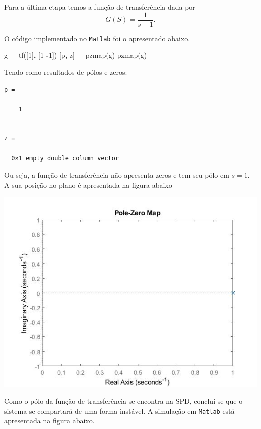 \documentclass[
]{book}
\newenvironment{Shaded}{\begin{snugshade}}{\end{snugshade}}
\newcommand{\FloatTok}[1]{\textcolor[rgb]{0.00,0.00,0.81}{#1}}
\newcommand{\NormalTok}[1]{#1}
\newcommand{\OperatorTok}[1]{\textcolor[rgb]{0.81,0.36,0.00}{\textbf{#1}}}
\newcommand{\VariableTok}[1]{\textcolor[rgb]{0.00,0.00,0.00}{#1}}
\theoremstyle{definition}
\theoremstyle{definition}
\theoremstyle{definition}
\theoremstyle{remark}
\begin{document}
Para a última etapa temos a função de transferência dada por
\[
G(S)= \frac {1}{s-1}.
\]

O código implementado no \texttt{Matlab} foi o apresentado abaixo.

\begin{Shaded}
\begin{Highlighting}[]
\VariableTok{g} \OperatorTok{=} \VariableTok{tf}\NormalTok{([}\FloatTok{1}\NormalTok{]}\OperatorTok{,}\NormalTok{ [}\FloatTok{1} \OperatorTok{{-}}\FloatTok{1}\NormalTok{])}
\NormalTok{[}\VariableTok{p}\OperatorTok{,} \VariableTok{z}\NormalTok{] }\OperatorTok{=} \VariableTok{pzmap}\NormalTok{(}\VariableTok{g}\NormalTok{)}
\VariableTok{pzmap}\NormalTok{(}\VariableTok{g}\NormalTok{)}
\end{Highlighting}
\end{Shaded}

Tendo como resultados de pólos e zeros:

\begin{verbatim}
p =

    1


z =

  0×1 empty double column vector
\end{verbatim}

Ou seja, a função de transferência não apresenta zeros e tem seu pólo em \(s = 1\). A sua posição no plano é apresentada na figura abaixo

\includegraphics{Imagens/Lab2/tau3.jpg}

Como o pólo da função de transferência se encontra na SPD, conclui-se que o sistema se compartará de uma forma instável. A simulação em \texttt{Matlab} está apresentada na figura abaixo.
\end{document}
